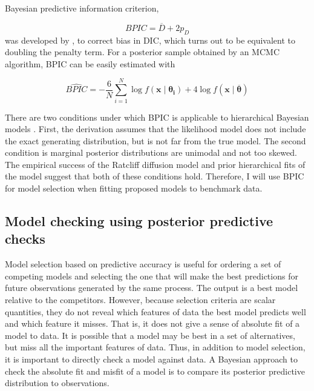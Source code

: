 \documentclass[12pt]{article}
\begin{document}
	Bayesian predictive information criterion, 

\begin{equation}
BPIC = \overline D + 2p_D
\end{equation}
was developed by \citet{Ano2007,Ano2011}, to correct bias in DIC, which turns out to be equivalent to doubling the penalty term. For a posterior sample obtained by an MCMC algorithm, BPIC can be easily estimated with 

\begin{equation}
\hat{BPIC} = -\frac{6}{N}\sum_{i=1}^N \operatorname{log}f(\boldsymbol{x} \mid \boldsymbol{\theta_i}) + 4\operatorname{log}f(\boldsymbol{x} \mid  \boldsymbol{\overline\theta})
\end{equation}
 
	There are two conditions under which BPIC is applicable to hierarchical Bayesian models \citep{Ano2011}. First, the derivation assumes that the likelihood model does not include the exact generating distribution, but is not far from the true model. The second condition is marginal posterior distributions are unimodal and not too skewed. The empirical success of the Ratcliff diffusion model \citep{RatMck2008,Wag2009,VanTue2011} and prior hierarchical fits of the model suggest that both of these conditions hold. Therefore, I will use BPIC for model selection when fitting proposed models to benchmark data. 

\subsection{Model checking using posterior predictive checks}
	Model selection based on predictive accuracy is useful for ordering a set of competing models and selecting the one that will make the best predictions for future observations generated by the same process. The output is a best model relative to the competitors. However, because selection criteria are scalar quantities, they do not reveal which features of data the best model predicts well and which feature it misses. That is, it does not give a sense of absolute fit of a model to data. It is possible that a model may be best in a set of alternatives, but miss all the important features of data. Thus, in addition to model selection, it is important to directly check a model against data. A Bayesian approach to check the absolute fit and misfit of a model is to compare its posterior predictive distribution to observations. 
\end{document}
